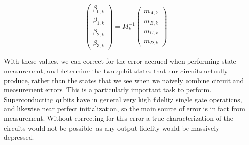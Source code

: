 \begin{equation}
\begin{pmatrix} \beta_{0,k} \\ \beta_{1,k} \\ \beta_{2,k} \\ \beta_{3,k}
\end{pmatrix}=M_k^{-1}
\begin{pmatrix} \overline{m}_{A,k} \\ \overline{m}_{B,k} \\ \overline{m}_{C,k}
\\ \overline{m}_{D,k}
\end{pmatrix}
\end{equation}

With these values, we can correct for the error accrued when performing state
measurement, and determine the two-qubit states that our circuits actually
produce, rather than the states that we see when we naively combine circuit and
measurement errors. This is a particularly important task to perform.
Superconducting qubits have in general very high fidelity single gate operations,
and likewise near perfect initialization, so the main source of error is in fact
from measurement. Without correcting for this error a true characterization of
the circuits would not be possible, as any output fidelity would be massively
depressed.

